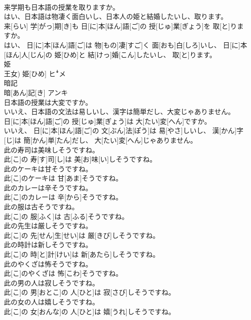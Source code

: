 \documentclass[8pt]{extreport}
\begin{document}
\begin{CJK}{UTF8}{min}
\\	来学期も日本語の授業を取りますか。 
\\	はい、日本語は物凄く面白いし、日本人の姫と結婚したいし、取ります。	
\\	来[らい] 学[がっ]期[き]も 日[に]本[ほん]語[ご]の 授[じゅ]業[ぎょう]を 取[と]りますか。 
\\	はい、 日[に]本[ほん]語[ご]は 物[もの]凄[すご]く 面[おも]白[しろ]いし、 日[に]本[ほん]人[じん]の 姫[ひめ]と 結[けっ]婚[こん]したいし、 取[と]ります。
\\	姫	
\\	王女)	姫[ひめ]	ヒꜜメ
\\	暗記	
\\	暗[あん]記[き]	アンキ
\\	日本語の授業は大変ですか。 
\\	いいえ、日本語の文法は易しいし、漢字は簡単だし、大変じゃありません。	
\\	日[に]本[ほん]語[ご]の 授[じゅ]業[ぎょう]は 大[たい]変[へん]ですか。 
\\	いいえ、 日[に]本[ほん]語[ご]の 文[ぶん]法[ぽう]は 易[やさ]しいし、 漢[かん]字[じ]は 簡[かん]単[たん]だし、 大[たい]変[へん]じゃありません。
\\	此の寿司は美味しそうですね。	
\\	此[こ]の 寿[す]司[し]は 美[お]味[い]しそうですね。
\\	此のケーキは甘そうですね。	
\\	此[こ]のケーキは 甘[あま]そうですね。
\\	此のカレーは辛そうですね。	
\\	此[こ]のカレーは 辛[から]そうですね。
\\	此の服は古そうですね。	
\\	此[こ]の 服[ふく]は 古[ふる]そうですね。
\\	此の先生は厳しそうですね。	
\\	此[こ]の 先[せん]生[せい]は 厳[きび]しそうですね。
\\	此の時計は新しそうですね。	
\\	此[こ]の 時[と]計[けい]は 新[あたら]しそうですね。
\\	此のやくざは怖そうですね。	
\\	此[こ]のやくざは 怖[こわ]そうですね。
\\	此の男の人は寂しそうですね。	
\\	此[こ]の 男[おとこ]の 人[ひと]は 寂[さび]しそうですね。
\\	此の女の人は嬉しそうですね。	
\\	此[こ]の 女[おんな]の 人[ひと]は 嬉[うれ]しそうですね。

\end{CJK}
\end{document}
